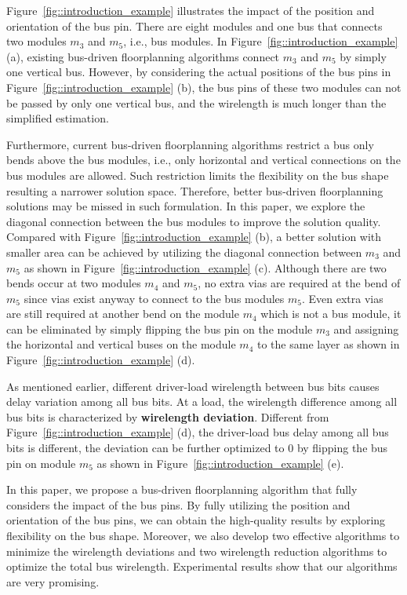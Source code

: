 Figure~\ref{fig::introduction_example} illustrates the impact of
the position and orientation of the bus pin. There are eight
modules and one bus that connects two modules $m_3$ and $m_5$,
i.e., bus modules. In Figure~\ref{fig::introduction_example} (a),
existing bus-driven floorplanning algorithms connect $m_3$ and
$m_5$ by simply one vertical bus. However, by considering the
actual positions of the bus pins in
Figure~\ref{fig::introduction_example} (b), the bus pins of these
two modules can not be passed by only one vertical bus, and the
wirelength is much longer than the simplified estimation.

Furthermore, current bus-driven floorplanning algorithms restrict
a bus only bends above the bus modules, i.e., only
horizontal and vertical connections on the bus modules are
allowed. Such restriction limits the flexibility on the bus shape
resulting a narrower solution space. Therefore,
better bus-driven floorplanning solutions may be missed in such
formulation. In this paper, we explore the diagonal connection
between the bus modules to improve the solution quality. Compared with
Figure~\ref{fig::introduction_example} (b), a better solution with
smaller area can be achieved by utilizing the diagonal connection
between $m_3$ and $m_5$ as shown in
Figure~\ref{fig::introduction_example} (c). Although there are two
bends occur at two modules $m_4$ and $m_5$,
no extra vias are required at the bend of $m_5$ since vias exist
anyway to connect to the bus modules $m_5$. Even extra vias are
still required at another bend on the module $m_4$ which is not
a bus module, it can be eliminated by simply flipping the bus
pin on the module $m_3$ and assigning the horizontal and vertical
buses on the module $m_4$ to the same layer as shown in
Figure~\ref{fig::introduction_example} (d).

As mentioned earlier, different driver-load wirelength between bus
bits causes delay variation among all bus bits. At a load,
the wirelength difference among all bus bits is characterized by
\textbf{wirelength deviation}. Different from
Figure~\ref{fig::introduction_example} (d), the driver-load
bus delay among all bus bits is different, the deviation can be
further optimized to 0 by flipping the bus pin on module $m_5$ as
shown in Figure~\ref{fig::introduction_example} (e).

In this paper, we propose a bus-driven
floorplanning algorithm that fully considers the impact of the
bus pins. By fully utilizing the position and orientation of the
bus pins, we can obtain the high-quality results by exploring
flexibility on the bus shape. Moreover, we also
develop two effective algorithms to minimize the wirelength
deviations and two wirelength reduction algorithms to optimize
the total bus wirelength. Experimental results show that our
algorithms are very promising.


